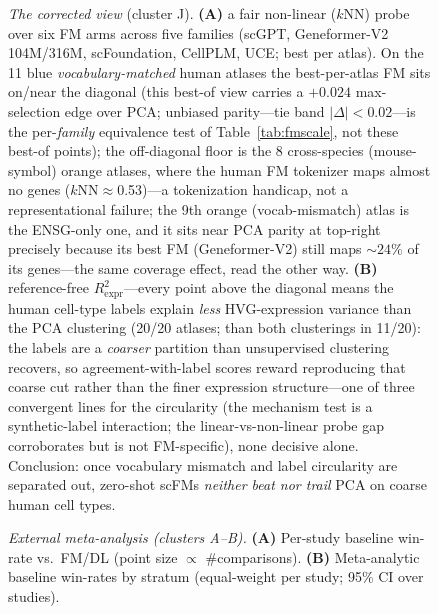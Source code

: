 \documentclass[fleqn,10pt,lineno]{wlpeerj}  %
\newcommand{\fitfig}[1]{\resizebox{\ifdim\width>\linewidth\linewidth\else\width\fi}{!}{#1}}
\begin{document}
\begin{figure}[htb]\centering\fitfig{}
\caption{\emph{The corrected view} (cluster J). \textbf{(A)} a fair non-linear ($k$NN) probe over six FM arms across five families (scGPT, Geneformer-V2 104M/316M, scFoundation, CellPLM, UCE; best per atlas). On the 11 blue \emph{vocabulary-matched} human atlases the best-per-atlas FM sits on/near the diagonal (this best-of view carries a $+0.024$ max-selection edge over PCA; unbiased parity---tie band $|\Delta|<0.02$---is the per-\emph{family} equivalence test of Table~\ref{tab:fmscale}, not these best-of points); the off-diagonal floor is the 8 cross-species (mouse-symbol) orange atlases, where the human FM tokenizer maps almost no genes ($k$NN${\approx}$0.53)---a tokenization handicap, not a representational failure; the 9th orange (vocab-mismatch) atlas is the ENSG-only one, and it sits near PCA parity at top-right precisely because its best FM (Geneformer-V2) still maps ${\sim}24\%$ of its genes---the same coverage effect, read the other way. \textbf{(B)} reference-free $R^2_{\mathrm{expr}}$---every point above the diagonal means the human cell-type labels explain \emph{less} HVG-expression variance than the PCA clustering (20/20 atlases; than both clusterings in 11/20): the labels are a \emph{coarser} partition than unsupervised clustering recovers, so agreement-with-label scores reward reproducing that coarse cut rather than the finer expression structure---one of three convergent lines for the circularity (the mechanism test is a synthetic-label interaction; the linear-vs-non-linear probe gap corroborates but is not FM-specific), none decisive alone. Conclusion: once vocabulary mismatch and label circularity are separated out, zero-shot scFMs \emph{neither beat nor trail} PCA on coarse human cell types.}\label{fig:fair}\end{figure}

\begin{figure}[htb]\centering\fitfig{}
\caption{\emph{External meta-analysis (clusters A--B).} \textbf{(A)} Per-study baseline win-rate vs.\ FM/DL (point size $\propto$ \#comparisons). \textbf{(B)} Meta-analytic baseline win-rates by stratum (equal-weight per study; 95\% CI over studies).}\label{fig:meta}\end{figure}
\end{document}

